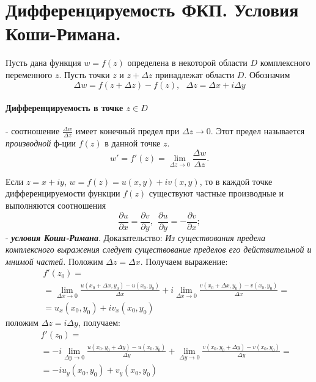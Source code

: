 \documentclass[12pt]{extarticle}
\begin{document}
\section{Дифференцируемость ФКП. Условия Коши-Римана.}

Пусть дана функция $w=f(z)$ определена в некоторой области $D$
комплексного переменного $z$. Пусть точки $z$ и $z+\Delta z$ принадлежат
области $D$. Обозначим
\begin{displaymath}
    \Delta w=f(z+\Delta z)-f(z),
    \ \ \ \Delta z=\Delta x+i\Delta y
\end{displaymath}

\paragraph{Дифференцируемость в точке $z\in D$} -
соотношение $\frac{\Delta w}{\Delta z}$ имеет конечный предел при
$\Delta z \to 0$. Этот предел называется \textit{производной} ф-ции
$f(z)$ в данной точке $z$.
\begin{displaymath}
    w'=f'(z)=\lim\limits_{\Delta z\rightarrow 0}\frac{\Delta
    w}{\Delta z}.
\end{displaymath}
\par Если $z=x+iy$, $w=f(z)=u(x,y)+iv(x,y)$, то в каждой точке
дифференцируемости функции $f(z)$ существуют частные производные и
выполняются соотношения
\begin{displaymath}
\frac{\partial u}{\partial x}=\frac{\partial v}{\partial y},
\ \ \frac{\partial u}{\partial y}=-\frac{\partial v}{\partial x};
\end{displaymath}
- \textbf{\textit{условия Коши-Римана}}. Доказательство:
\textit{Из существования предела комплексного выражения следует
существование пределов его действительной и мнимой частей.} Положим $\Delta
z=\Delta x$. Получаем выражение:
\begin{eqnarray*}
    &&f'(z_{0})=\\
    &&=\lim\limits_{\Delta x\rightarrow 0}\frac{u(x_{0}+\Delta
    x,y_{0})-u(x_{0},y_{0})}{\Delta x}
    +i\lim\limits_{\Delta x\rightarrow 0}\frac{v(x_{0}+\Delta
    x,y_{0})-v(x_{0},y_{0})}{\Delta x}=\\
    &&=u_{x}(x_{0},y_{0})+iv_{x}(x_{0},y_{0})
\end{eqnarray*}
положим $\Delta z=i\Delta y$, получаем:
\begin{eqnarray*}
&&f'(z_{0})=\\
&&=-i\lim\limits_{\Delta y\rightarrow 0}
\frac{u(x_{0},y_{0}+\Delta y)-u(x_{0},y_{0})}{\Delta y}
+\lim\limits_{\Delta y\rightarrow 0}
\frac{v(x_{0},y_{0}+\Delta y)-v(x_{0},y_{0})}{\Delta y}=\\
&&=-iu_{y}(x_{0},y_{0})+v_{y}(x_{0},y_{0})
\end{eqnarray*}
\end{document}
